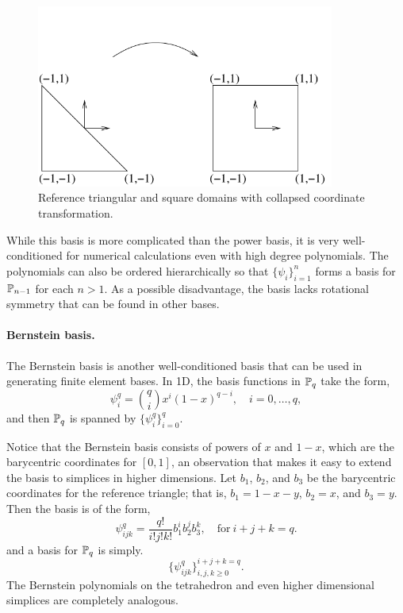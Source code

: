 \begin{figure}
\begin{center}
\includegraphics[height=6cm]{chapters/kirby-1/pdf/tricoord.pdf}
\end{center}
\caption{Reference triangular and square domains with collapsed
  coordinate transformation.}
\label{fig:tricoord}
\end{figure}

While this basis is more complicated than the power basis, it is
very well-conditioned for numerical calculations even with high degree
polynomials.  The polynomials can also be ordered hierarchically so that
$\{ \psi_i \}_{i=1}^{n}$ forms a basis for $\P_{n-1}$ for each $n >
1$.  As a possible disadvantage, the basis lacks rotational symmetry
that can be found in other bases.

\paragraph{Bernstein basis.}
The Bernstein basis is another well-conditioned basis that can be used
in generating finite element bases.  In 1D, the basis functions in $\P_q$
take the form,
\begin{equation}
\psi_i^q = \binom{q}{i} x^i (1-x)^{q-i}, \quad i=0,\ldots,q,
\end{equation}
and then $\P_q$ is spanned by $\{ \psi_i^q \}_{i=0}^q$.

Notice that the Bernstein basis consists of powers of $x$ and
$1-x$, which are the barycentric coordinates for $[0,1]$,
an observation that makes it easy to extend the basis to simplices
in higher dimensions.  Let $b_1$, $b_2$, and $b_3$ be the barycentric
coordinates for the reference triangle; that is, $b_1=1-x-y$, $b_2=x$,
and $b_3=y$. Then the basis is of the form,
\begin{equation}
\psi_{ijk}^q = \frac{q!}{i!j!k!} b_1^i b_2^j b_3^k, \quad  \mbox{for} \ i+j+k=q .
\end{equation}
and a basis for $\P_q$ is simply.
\begin{equation}
\{ \psi_{ijk}^q \}_{i,j,k\geq 0}^{i+j+k = q} .
\end{equation}
The Bernstein polynomials on the tetrahedron and even higher dimensional
simplices are completely analogous.

